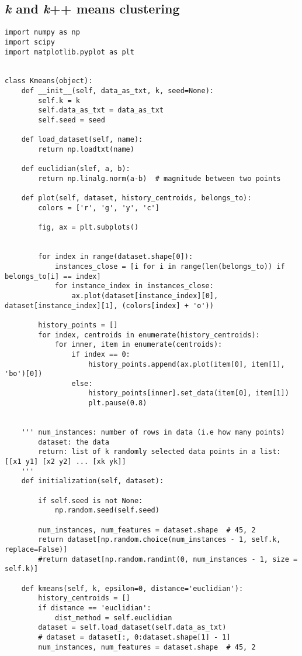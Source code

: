 \subsection{\textit{k} and \textit{k}++ means clustering}
\begin{verbatim}
import numpy as np
import scipy
import matplotlib.pyplot as plt


class Kmeans(object):
    def __init__(self, data_as_txt, k, seed=None):
        self.k = k
        self.data_as_txt = data_as_txt
        self.seed = seed

    def load_dataset(self, name):
        return np.loadtxt(name)

    def euclidian(slef, a, b):
        return np.linalg.norm(a-b)  # magnitude between two points

    def plot(self, dataset, history_centroids, belongs_to):
        colors = ['r', 'g', 'y', 'c']

        fig, ax = plt.subplots()


        for index in range(dataset.shape[0]):
            instances_close = [i for i in range(len(belongs_to)) if belongs_to[i] == index]
            for instance_index in instances_close:
                ax.plot(dataset[instance_index][0], dataset[instance_index][1], (colors[index] + 'o'))

        history_points = []
        for index, centroids in enumerate(history_centroids):
            for inner, item in enumerate(centroids):
                if index == 0:
                    history_points.append(ax.plot(item[0], item[1], 'bo')[0])
                else:
                    history_points[inner].set_data(item[0], item[1])
                    plt.pause(0.8)


    ''' num_instances: number of rows in data (i.e how many points)
        dataset: the data
        return: list of k randomly selected data points in a list: [[x1 y1] [x2 y2] ... [xk yk]]
    '''
    def initialization(self, dataset):

        if self.seed is not None:
            np.random.seed(self.seed)

        num_instances, num_features = dataset.shape  # 45, 2
        return dataset[np.random.choice(num_instances - 1, self.k, replace=False)]
        #return dataset[np.random.randint(0, num_instances - 1, size = self.k)]

    def kmeans(self, k, epsilon=0, distance='euclidian'):
        history_centroids = []
        if distance == 'euclidian':
            dist_method = self.euclidian
        dataset = self.load_dataset(self.data_as_txt)
        # dataset = dataset[:, 0:dataset.shape[1] - 1]
        num_instances, num_features = dataset.shape  # 45, 2



\end{verbatim}

